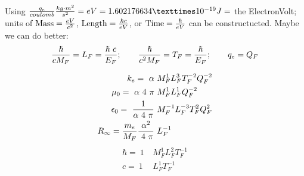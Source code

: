 
\maketitle
\begin{multicols}{2}
Using ${q_e \over coulomb}{kg\cdot m^2 \over s^2}=eV=1.602176634×10^{-19} J =$ the ElectronVolt; units of $\text{Mass}={eV \over c^2}$, $\text{Length}={\hbar c \over eV}$, or $\text{Time}={\hbar \over eV}$ can be constructucted.  Maybe we can do better:
$$
 {\hbar \over c M_F} = L_F = {\hbar ~ c \over E_F};\qquad
{\hbar \over c^2 M_F} = T_F = {\hbar \over E_F};\qquad
q_e = Q_F
$$
\begin{multicols}{2}[\setlength{\columnseprule}{0pt}]\noindent\begin{align*}
k_e = ~\alpha &~M_F^{1}L_F^{3}T_F^{-2}Q_F^{-2}\\
\mu _0 = ~\alpha~4~\pi &~M_F^{1}L_F^{1}Q_F^{-2}\\
\epsilon _0 = ~{1 \over \alpha~4~\pi} & ~M_F^{-1}L_F^{-3}T_F^{2}Q_F^{2}\\%
R_\infty = {m_e\over M_F}{\alpha ^2\over~4~\pi}&~L_F^{-1}
\end{align*}\noindent\begin{align*}
\hbar = ~1 & ~M_F^{1}L_F^{2}T_F^{-1}\\
c = ~1 & ~L_F^{1}T_F^{-1}\\

\end{align*}
\end{multicols}
\end{multicols}
